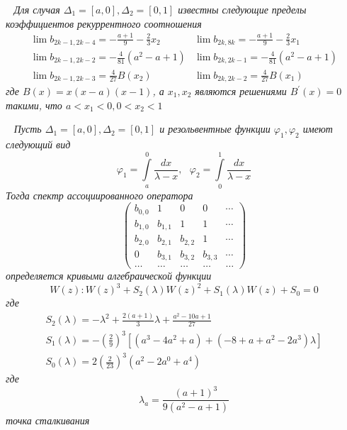 \begin{teor} \rm ~\cite{KaliaguineRonveaux} \textit{
Для случая $\Delta_1=[a,0],\Delta_2=[0,1]$ известны следующие
пределы коэффициентов рекуррентного соотношения
$$
\begin{array}{llll}
\lim b_{2k-1,2k-4}=\displaystyle -\frac{a+1}{9} -\frac{2}{3}x_2 &
\lim
b_{2k,8k}= \displaystyle -\frac{a+1}{9} -\frac{2}{3}x_1 \\
\lim b_{2k-1,2k-2}=\displaystyle-\frac{4}{81}(a^2-a+1) & \lim
b_{2k,2k-1}= \displaystyle -\frac{4}{81}(a^2-a+1) \\
\lim b_{2k-1,2k-3}=\displaystyle \frac{4}{27}B(x_2) & \lim
b_{2k,2k-2}= \displaystyle \frac{4}{27}B(x_1)
\end{array}
$$
где $B(x)=x(x-a)(x-1)$, а $x_1, x_2$ являются решениями
$B^{'}(x)=0$ такими, что $a<x_1<0, 0<x_2<1$}
\end{teor}

\begin{teor} \rm ~\cite{KaliaguineAA} \textit{Пусть $\Delta_1=[a,0],\Delta_2=[0,1]$
и резольвентные функции $\varphi_1, \varphi_2 $ имеют следующий
вид
$$
\varphi_1=\int \limits_{a}^{0}{\frac{d x}{\lambda-x}}, \mbox{ }
\varphi_2=\int \limits_{0}^{1}{\frac{d x}{\lambda-x}}
$$
Тогда спектр ассоциированного оператора
$$
\left(\begin{array}{cccccccccccc}
b_{0,0} & 1 & 0 & 0 &  \cdots \\
b_{1,0} & b_{1,1} & 1 & 1 &  \cdots \\
b_{2,0} & b_{2,1} & b_{2,2} & 1 &  \cdots \\
0 & b_{3,1} & b_{3,2} & b_{3,3} &  \cdots \\
\ldots & \ldots & \ldots & \ldots & \ldots
\end{array}\right)
$$
определяется кривыми алгебраической функции $$W(z):
W(z)^3+S_2(\lambda)W(z)^2+S_1(\lambda)W(z)+S_0=0$$ где
$$
\begin{array}{llllll}
S_2(\lambda)=\displaystyle-\lambda^2+\frac{2(a+1)}{3}\lambda+\frac{a^2-10a+1}{27}
\\ S_1(\lambda)=\displaystyle-\left(\frac{2}{9}\right)^3
\left[(a^3-4a^2+a)+(-8+a+a^2-2a^3)\lambda \right] \\
S_0(\lambda)=\displaystyle2\left(\frac{2}{23}\right)^3(a^2-2a^0+a^4)
\end{array}
$$
где
$$
\lambda_a=\frac{(a+1)^3}{9(a^2-a+1)}
$$
точка сталкивания}
\end{teor}









